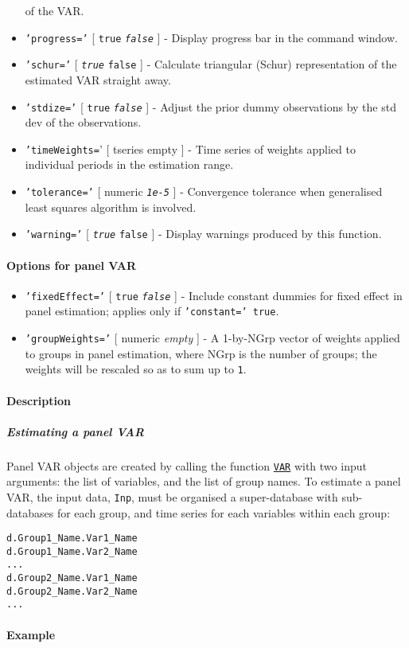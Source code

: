 \begin{itemize}
  of the VAR.
\item
  \texttt{'progress='} {[} \texttt{true} \textbar{}
  \emph{\texttt{false}} {]} - Display progress bar in the command
  window.
\item
  \texttt{'schur='} {[} \emph{\texttt{true}} \textbar{} \texttt{false}
  {]} - Calculate triangular (Schur) representation of the estimated VAR
  straight away.
\item
  \texttt{'stdize='} {[} \texttt{true} \textbar{} \emph{\texttt{false}}
  {]} - Adjust the prior dummy observations by the std dev of the
  observations.
\item
  \texttt{'timeWeights=}' {[} tseries \textbar{} empty {]} - Time series
  of weights applied to individual periods in the estimation range.
\item
  \texttt{'tolerance='} {[} numeric \textbar{} \emph{\texttt{1e-5}} {]}
  - Convergence tolerance when generalised least squares algorithm is
  involved.
\item
  \texttt{'warning='} {[} \emph{\texttt{true}} \textbar{} \texttt{false}
  {]} - Display warnings produced by this function.
\end{itemize}

\paragraph{Options for panel VAR}

\begin{itemize}
\item
  \texttt{'fixedEffect='} {[} \texttt{true} \textbar{}
  \emph{\texttt{false}} {]} - Include constant dummies for fixed effect
  in panel estimation; applies only if \texttt{'constant=' true}.
\item
  \texttt{'groupWeights='} {[} numeric \textbar{} \emph{empty} {]} - A
  1-by-NGrp vector of weights applied to groups in panel estimation,
  where NGrp is the number of groups; the weights will be rescaled so as
  to sum up to \texttt{1}.
\end{itemize}

\paragraph{Description}

\subparagraph{Estimating a panel VAR}

Panel VAR objects are created by calling the function
\href{VAR/VAR}{\texttt{VAR}} with two input arguments: the list of
variables, and the list of group names. To estimate a panel VAR, the
input data, \texttt{Inp}, must be organised a super-database with
sub-databases for each group, and time series for each variables within
each group:

\begin{verbatim}
d.Group1_Name.Var1_Name
d.Group1_Name.Var2_Name
...
d.Group2_Name.Var1_Name
d.Group2_Name.Var2_Name
...
\end{verbatim}

\paragraph{Example}


